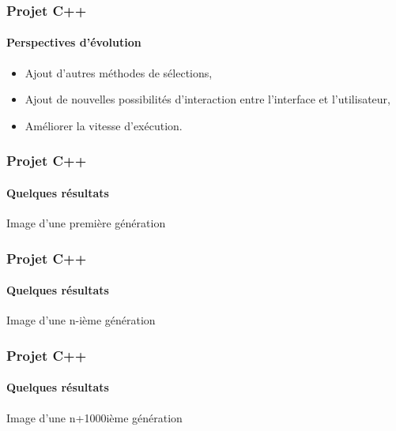 \documentclass{beamer}
\begin{document}
	\begin{frame}
	\frametitle{Projet C++}
	\framesubtitle{Perspectives d'évolution}
		\begin{itemize}
		\item Ajout d'autres méthodes de sélections,
		\item Ajout de nouvelles possibilités d'interaction entre l'interface et l'utilisateur,
		\item Améliorer la vitesse d'exécution. 
		\end{itemize}			
	\end{frame}
	
	\begin{frame}
	\frametitle{Projet C++}
	\framesubtitle{Quelques résultats}
	
	\begin{center}
	Image d'une première génération
	\end{center}		
			
	\end{frame}
	
	\begin{frame}
	\frametitle{Projet C++}
	\framesubtitle{Quelques résultats}
	
	\begin{center}
	Image d'une n-ième génération
	\end{center}		
			
	\end{frame}		
	
	\begin{frame}
	\frametitle{Projet C++}
	\framesubtitle{Quelques résultats}
	
	\begin{center}
	Image d'une n+1000ième génération
	\end{center}		
			
	\end{frame}		
	
\end{document}
